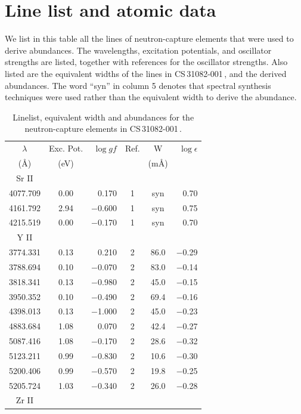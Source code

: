 \documentclass{aa}
\def\cs{CS\,31082-001\,}
\begin{document}
\newpage

\appendix
\section{Line list and atomic data}

We list in this table all the lines of neutron-capture elements that
were used to derive abundances. The wavelengths, excitation potentials,
and oscillator strengths are listed, together with references for the
oscillator strengths. Also listed are the equivalent widths of the
lines in \cs, and the derived abundances. The word ``syn'' in column 5
denotes that spectral synthesis techniques were used rather than the
equivalent width to derive the abundance. 

\begin{table}[h]
\caption{Linelist, equivalent width and abundances for the
neutron-capture elements in \cs.}
\begin{tabular}{ccrccr}
\hline\hline
$\lambda$ & Exc. Pot. & $\log gf$ & Ref. & W & $\log \epsilon$ \\
  (\AA)   & (eV)      &           &      & (m\AA) &              \\ 
\hline
Sr II \\
\hline
4077.709 & 0.00 &    0.170 & 1 &  syn  &    0.70\\
4161.792 & 2.94 & $-$0.600 & 1 &  syn  &    0.75\\
4215.519 & 0.00 & $-$0.170 & 1 &  syn  &    0.70\\
\hline
Y II\\
\hline
3774.331 & 0.13 &    0.210 & 2 &  86.0 & $-$0.29\\
3788.694 & 0.10 & $-$0.070 & 2 &  83.0 & $-$0.14\\
3818.341 & 0.13 & $-$0.980 & 2 &  45.0 & $-$0.15\\
3950.352 & 0.10 & $-$0.490 & 2 &  69.4 & $-$0.16\\
4398.013 & 0.13 & $-$1.000 & 2 &  45.0 & $-$0.23\\
4883.684 & 1.08 &    0.070 & 2 &  42.4 & $-$0.27\\
5087.416 & 1.08 & $-$0.170 & 2 &  28.6 & $-$0.32\\
5123.211 & 0.99 & $-$0.830 & 2 &  10.6 & $-$0.30\\
5200.406 & 0.99 & $-$0.570 & 2 &  19.8 & $-$0.25\\
5205.724 & 1.03 & $-$0.340 & 2 &  26.0 & $-$0.28\\
\hline
Zr II\\

\end{tabular}
\end{table}
\end{document}
